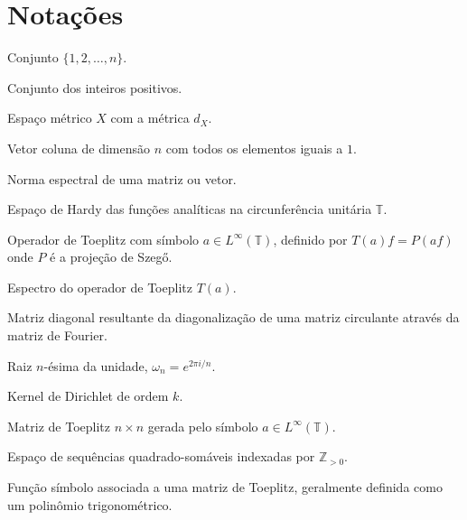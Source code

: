 \section*{Notações}

\begin{description}[leftmargin=!, labelwidth=\widthof{\texttt{Função $f : X \to Y$}}]
  \item[{$[n]$}] Conjunto $\{1, 2, \dots, n\}$.

  \item[$\mathbb{Z}_{>0}$] Conjunto dos inteiros positivos.

  \item[$(X, d_X)$] Espaço métrico $X$ com a métrica $d_X$.

  \item[$\mathbf{1}_n$] Vetor coluna de dimensão $n$ com todos os elementos iguais a $1$.

  \item[$\| \cdot \|_2$] Norma espectral de uma matriz ou vetor.

  \item[$H^2(\mathbb{T})$] Espaço de Hardy das funções analíticas na circunferência unitária $\mathbb{T}$.

  \item[$T(a)$] Operador de Toeplitz com símbolo $a \in L^\infty(\mathbb{T})$, definido por $T(a)f = P(af)$ onde $P$ é a projeção de Szegő.

  \item[$\sigma(T(a))$] Espectro do operador de Toeplitz $T(a)$.

  \item[$\Lambda$] Matriz diagonal resultante da diagonalização de uma matriz circulante através da matriz de Fourier.

  \item[$\omega_n$] Raiz $n$-ésima da unidade, $\omega_n = e^{2\pi i / n}$.

  \item[$D_k(t)$] Kernel de Dirichlet de ordem $k$.

  \item[$T_n(a)$] Matriz de Toeplitz $n \times n$ gerada pelo símbolo $a \in L^\infty(\mathbb{T})$.

  \item[$l^2(\mathbb{Z}_{> 0})$] Espaço de sequências quadrado-somáveis indexadas por $\mathbb{Z}_{> 0}$.

  \item[$a(x)$] Função símbolo associada a uma matriz de Toeplitz, geralmente definida como um polinômio trigonométrico.


\end{description}
